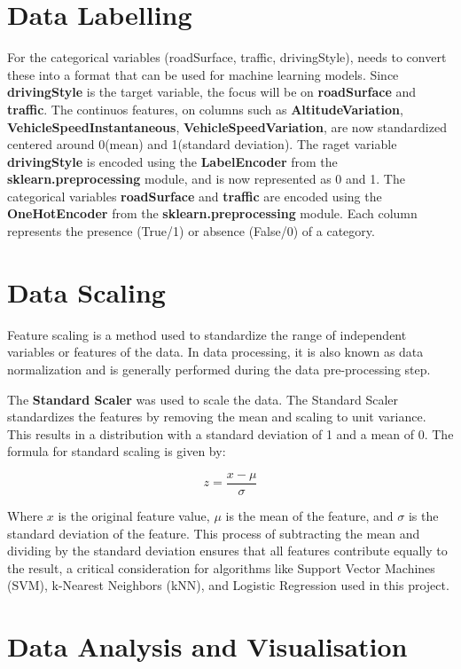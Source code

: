 \section{Data Labelling}
For the categorical variables (roadSurface, traffic, drivingStyle), needs to convert these into a format that can be used for machine learning models. 
Since \textbf{drivingStyle} is the target variable, the focus will be on \textbf{roadSurface} and \textbf{traffic}. The continuos features, on columns such as \textbf{AltitudeVariation}, 
\textbf{VehicleSpeedInstantaneous}, \textbf{VehicleSpeedVariation}, are now standardized centered around 0(mean) and 1(standard deviation). 
The raget variable \textbf{drivingStyle} is encoded using the \textbf{LabelEncoder} from the \textbf{sklearn.preprocessing} module, and is now represented as 0 and 1.
The categorical variables \textbf{roadSurface} and \textbf{traffic} are encoded using the \textbf{OneHotEncoder} from the \textbf{sklearn.preprocessing} module. Each column represents
the presence (True/1) or absence (False/0) of a category.

\section{Data Scaling}

Feature scaling is a method used to standardize the range of independent variables or features of the data. In data processing, it is also known as data 
normalization and is generally performed during the data pre-processing step.

The \textbf{Standard Scaler} was used to scale the data. The Standard Scaler standardizes the features by removing the mean and scaling to unit variance.
This results in a distribution with a standard deviation of 1 and a mean of 0. The formula for standard scaling is given by:

\begin{equation}
    z = \frac{x - \mu}{\sigma}
\end{equation}

Where $x$ is the original feature value, $\mu$ is the mean of the feature, and $\sigma$ is the standard deviation of the feature. This process of subtracting the mean and 
dividing by the standard deviation ensures that all features contribute equally to the result, a critical consideration for algorithms like Support Vector Machines (SVM), 
k-Nearest Neighbors (kNN), and Logistic Regression used in this project.


\section{Data Analysis and Visualisation}

